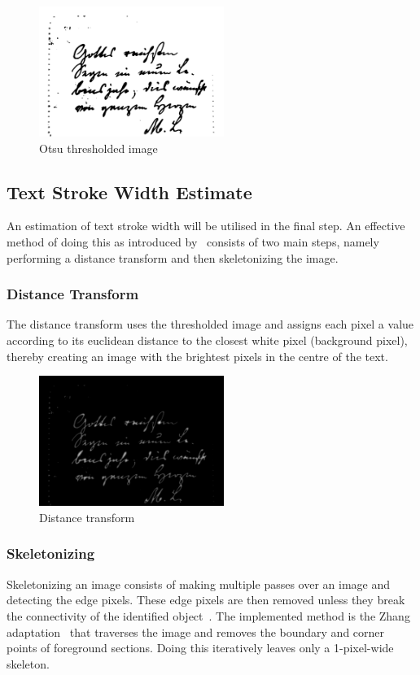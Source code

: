 \documentclass[a4paper, 12pt]{report}
\begin{document}
\begin{figure}[ht]
    \centering
    \includegraphics[width=6cm]{otsu thresholded.png}
    \caption{Otsu thresholded image}
    \label{fig:4}
\end{figure}

\subsection{Text Stroke Width Estimate}
An estimation of text stroke width will be utilised in the final step. An
effective method of doing this as introduced by~\cite{strokewidth} consists of
two main steps, namely performing a distance transform and then skeletonizing
the image.

\subsubsection{Distance Transform}
The distance transform uses the thresholded image and assigns each pixel a
value according to its euclidean distance to the closest white pixel
(background pixel), thereby creating an image with the brightest pixels in the
centre of the text.

\begin{figure}[ht]
    \centering
    \includegraphics[width=6cm]{distance transform.png}
    \caption{Distance transform}
    \label{fig:5}
\end{figure}

\subsubsection{Skeletonizing}
Skeletonizing an image consists of making multiple passes over an image and
detecting the edge pixels. These edge pixels are then removed unless they break
the connectivity of the identified object~\cite{scikit-image}. The implemented
method is the Zhang adaptation~\cite{zhang_suen_1984} that traverses the image
and removes the boundary and corner points of foreground sections. Doing this
iteratively leaves only a 1-pixel-wide skeleton.
\end{document}
